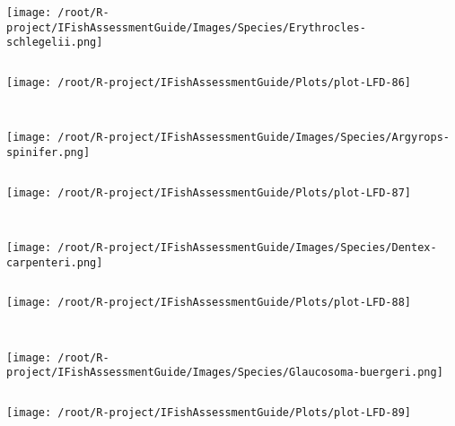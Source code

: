 \begin{knitrout}
\begin{kframe}
\begin{verbatim}
\end{verbatim}
\end{kframe}
\texttt{[image: /root/R-project/IFishAssessmentGuide/Images/Species/Erythrocles-schlegelii.png]}
\begin{kframe}\begin{verbatim}
\end{verbatim}
\end{kframe}
\texttt{[image: /root/R-project/IFishAssessmentGuide/Plots/plot-LFD-86]} 
\begin{kframe}\begin{verbatim}
 
\end{verbatim}
\end{kframe}
\texttt{[image: /root/R-project/IFishAssessmentGuide/Images/Species/Argyrops-spinifer.png]}
\begin{kframe}\begin{verbatim}
\end{verbatim}
\end{kframe}
\texttt{[image: /root/R-project/IFishAssessmentGuide/Plots/plot-LFD-87]} 
\begin{kframe}\begin{verbatim}
 
\end{verbatim}
\end{kframe}
\texttt{[image: /root/R-project/IFishAssessmentGuide/Images/Species/Dentex-carpenteri.png]}
\begin{kframe}\begin{verbatim}
\end{verbatim}
\end{kframe}
\texttt{[image: /root/R-project/IFishAssessmentGuide/Plots/plot-LFD-88]} 
\begin{kframe}\begin{verbatim}
 
\end{verbatim}
\end{kframe}
\texttt{[image: /root/R-project/IFishAssessmentGuide/Images/Species/Glaucosoma-buergeri.png]}
\begin{kframe}\begin{verbatim}
\end{verbatim}
\end{kframe}
\texttt{[image: /root/R-project/IFishAssessmentGuide/Plots/plot-LFD-89]} 
\begin{kframe}\begin{verbatim}
 

\end{verbatim}
\end{kframe}
\end{knitrout}
